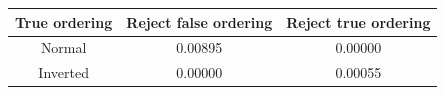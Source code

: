 \begin{tabular}{| c | c | c |}
\hline
True ordering & Reject false ordering & Reject true ordering \\
\hline
Normal & 0.00895 & 0.00000 \\
Inverted & 0.00000 & 0.00055 \\
\hline
\end{tabular}
